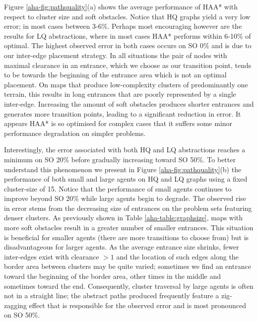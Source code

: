 \par \indent
Figure \ref{aha-fig:pathquality}(a) shows the average performance of HAA* with respect to cluster size and soft obstacles.  
Notice that HQ graphs yield a very low error; in most cases between 3-6\%. 
Perhaps most encouraging however are the results for LQ abstractions, where in most cases HAA* performs within 6-10\% of optimal. 
The highest observed error in both cases occurs on SO 0\% and is due to our inter-edge placement strategy.
In all situations the pair of nodes with maximal clearance in an entrance, which we choose as our transition point, tends to be towards the beginning of the entrance area which is not an optimal placement.
On maps that produce low-complexity clusters of predominantly one terrain, this results in long entrances that are poorly represented by a single inter-edge.
Increasing the amount of soft obstacles produces shorter entrances and generates more transition points, leading to a significant reduction in error. 
It appears HAA* is so optimised for complex cases that it suffers some minor performance degradation on simpler problems. 
\par \indent
Interestingly, the error associated with both HQ and LQ abstractions reaches a minimum on SO 20\% before gradually increasing toward SO 50\%. 
To better understand this phenomenon we present in Figure \ref{aha-fig:pathquality}(b) the performance of both small and large agents on HQ and LQ graphs using a fixed cluster-size of 15.
Notice that the performance of small agents continues to improve beyond SO 20\% while large agents begin to degrade.
The observed rise in error stems from the decreasing size of entrances on the problem sets featuring denser clusters. 
As previously shown in Table \ref{aha-table:graphsize}, maps with more soft obstacles result in a greater number of smaller entrances. 
This situation is beneficial for smaller agents (there are more transitions to choose from) but is disadvantageous for larger agents.
As the average entrance size shrinks, fewer inter-edges exist with clearance $>1$ and the location of such edges along the border area between clusters may be quite varied; sometimes we find an entrance toward the beginning of the border area, other times in the middle and sometimes toward the end.
Consequently, cluster traversal by large agents is often not in a straight line; the abstract paths produced frequently feature a zig-zagging effect that is responsible for the observed error and is most pronounced on SO 50\%.
